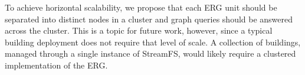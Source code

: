 To achieve horizontal scalability, we propose that each ERG unit should be separated into distinct nodes in
a cluster and graph queries should be answered across the cluster.  This is a topic for future work, however, since a typical
building deployment does not require that level of scale.  A collection of buildings, managed through
a single instance of StreamFS, would likely require a clustered implementation of the ERG.
















